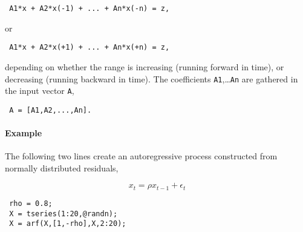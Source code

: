  \begin{verbatim}
 A1*x + A2*x(-1) + ... + An*x(-n) = z,
 \end{verbatim}
 
 or
 
 \begin{verbatim}
 A1*x + A2*x(+1) + ... + An*x(+n) = z,
 \end{verbatim}
 
 depending on whether the range is increasing (running forward in time),
 or decreasing (running backward in time). The coefficients
 \texttt{A1},\ldots{}\texttt{An} are gathered in the input vector
 \texttt{A},
 
 \begin{verbatim}
 A = [A1,A2,...,An].
 \end{verbatim}
 
 \paragraph{Example}
 
 The following two lines create an autoregressive process constructed
 from normally distributed residuals,
 
 \[ x_t = \rho x_{t-1} + \epsilon_t \]
 
 \begin{verbatim}
 rho = 0.8;
 X = tseries(1:20,@randn);
 X = arf(X,[1,-rho],X,2:20);
 \end{verbatim}


